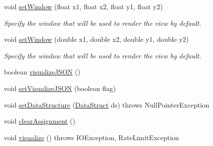 \begin{DoxyCompactItemize}
void \mbox{\hyperlink{classbridges_1_1connect_1_1_bridges_afff6882285f7615b775c59b2fc62b1c3}{set\+Window}} (float x1, float x2, float y1, float y2)
\begin{DoxyCompactList}\small\item\em Specify the window that will be used to render the view by default. \end{DoxyCompactList}\item 
void \mbox{\hyperlink{classbridges_1_1connect_1_1_bridges_a163a32a2fd3327c59d003f457e31eb63}{set\+Window}} (double x1, double x2, double y1, double y2)
\begin{DoxyCompactList}\small\item\em Specify the window that will be used to render the view by default. \end{DoxyCompactList}\item 
boolean \mbox{\hyperlink{classbridges_1_1connect_1_1_bridges_afd3c63780396e92c94c923037385b31d}{visualize\+J\+S\+ON}} ()
\item 
void \mbox{\hyperlink{classbridges_1_1connect_1_1_bridges_aa502aa32a9ac482da9c8455c6810b64d}{set\+Visualize\+J\+S\+ON}} (boolean flag)
\item 
void \mbox{\hyperlink{classbridges_1_1connect_1_1_bridges_a921a6603b2445b1abe30a1b3d6f0c255}{set\+Data\+Structure}} (\mbox{\hyperlink{classbridges_1_1base_1_1_data_struct}{Data\+Struct}} ds)  throws Null\+Pointer\+Exception 
\item 
void \mbox{\hyperlink{classbridges_1_1connect_1_1_bridges_ad79081ca241e5bcb77b1ed52a09fdd39}{clear\+Assignment}} ()
\item 
void \mbox{\hyperlink{classbridges_1_1connect_1_1_bridges_a1853d64ffb8675ba2ec227a2b819cd24}{visualize}} ()  throws I\+O\+Exception, Rate\+Limit\+Exception 
\end{DoxyCompactItemize}

